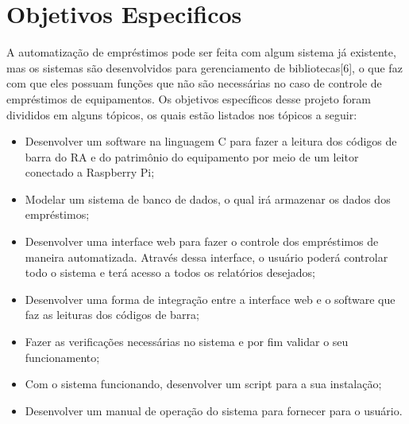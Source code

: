 \section[Objetivos Específicos]{Objetivos Especificos}
A automatização de empréstimos pode ser feita com algum sistema já existente, mas os sistemas são desenvolvidos para gerenciamento de bibliotecas[6], o que faz com que eles possuam funções que não são necessárias no caso de controle de empréstimos de equipamentos. Os objetivos específicos desse projeto foram divididos em alguns tópicos, os quais estão listados nos tópicos a seguir:

\begin{itemize}
   \item Desenvolver um software na linguagem C para fazer a leitura dos códigos de barra do RA e do patrimônio do equipamento por meio de um leitor conectado a Raspberry Pi;
   \item Modelar um sistema de banco de dados, o qual irá armazenar os dados dos empréstimos;
   \item Desenvolver uma interface web para fazer o controle dos empréstimos de maneira automatizada. Através dessa interface, o usuário poderá controlar todo o sistema e terá acesso a todos os relatórios desejados;
   \item Desenvolver uma forma de integração entre a interface web e o software que faz as
leituras dos códigos de barra;
   \item Fazer as verificações necessárias no sistema e por fim validar o seu funcionamento;
   \item Com o sistema funcionando, desenvolver um script para a sua instalação;
   \item Desenvolver um manual de operação do sistema para fornecer para o usuário.
\end{itemize}
